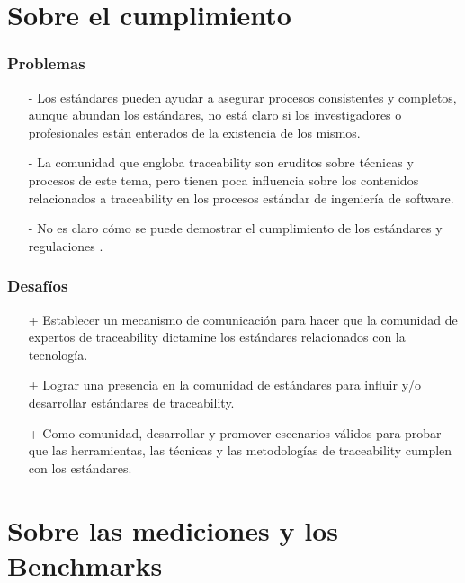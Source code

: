 \documentclass[a4paper,12pt,oneside,spanish]{book}
\begin{document}
\section{Sobre el cumplimiento}

\subsubsection{Problemas}

\begin{itemize}

\item[-] Los estándares pueden ayudar a asegurar procesos consistentes y completos, aunque abundan los estándares, no está claro si los investigadores o profesionales están enterados de la existencia de los mismos.

\item[-] La comunidad que engloba traceability son eruditos sobre técnicas y procesos de este tema, pero tienen poca influencia sobre los contenidos relacionados a traceability en los procesos estándar de ingeniería de software.

\item[-] No es claro cómo se puede demostrar el cumplimiento de los estándares y regulaciones .

\end{itemize}

\subsubsection{Desafíos}

\begin{itemize}

\item[+] Establecer un mecanismo de comunicación para hacer que la comunidad de expertos de traceability dictamine los estándares relacionados con la tecnología.

\item[+] Lograr una presencia en la comunidad de estándares para influir y/o desarrollar estándares de traceability.

\item[+] Como comunidad, desarrollar y promover escenarios válidos para probar que las herramientas, las técnicas y las metodologías de traceability cumplen con los estándares.

\end{itemize}


\section{Sobre las mediciones y los Benchmarks}
\end{document}
